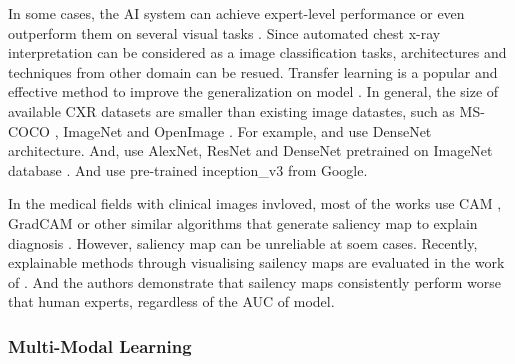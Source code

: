 In some cases, the AI system can achieve expert-level performance or even outperform them on several visual tasks \citep{Rajpurkar2017CheXNet, Yuan2020DAM, Tang2020AbnormalityCXRCNN}.  Since automated chest x-ray interpretation can be considered as a image classification tasks, architectures and techniques from other domain can be resued. Transfer learning is a popular and effective method to improve the generalization on model \citep{Zhuang2019TransferLearningSurvey}. In general, the size of available CXR datasets are smaller than existing image datastes, such as MS-COCO \citep{Lin2014MSCOCO}, ImageNet \citep{Deng2009ImageNet} and OpenImage \citep{Kuznetsova2020OpenImages}. For example, \citet{Yuan2020DAM} and \citet{Cohen2020Covid19} use DenseNet\citep{Huang2016DenseNet} architecture. And, \citet{Dunnmon2019CNNOnCXRAssessment} use AlexNet\citep{Alex2012AlexNet}, ResNet \citep{He2015ResNet} and DenseNet pretrained on ImageNet database \citep{Deng2009ImageNet}. And \citet{Yates2018RedDotCXR} use pre-trained inception_v3\citep{Szegedy2015InceptionV3} from Google.






In the medical fields with clinical images invloved, most of the works use CAM \citep{Zhou2015CAM}, GradCAM\citep{Selvaraju2017GradCAM} or other similar algorithms that generate saliency map to explain diagnosis \citep{Teixeira2021LIMEAndGradCAMOnCXR, Rajpurkar2018CheXNeXt, Rajpurkar2017CheXNet, Brunese2020ExplainableCovid19, Hou2021ExplainableCovid19}. However, saliency map can be unreliable at soem cases. Recently, explainable methods through visualising sailency maps are evaluated in the work of \citep{Saporta2021BechmarkingSaliencyMethods}. And the authors demonstrate that sailency maps consistently perform worse that human experts, regardless of the AUC of model.

\subsubsection{Multi-Modal Learning}


